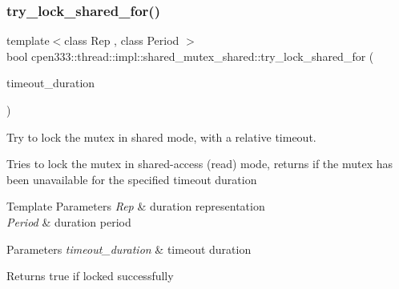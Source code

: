 \subsubsection{\texorpdfstring{try\+\_\+lock\+\_\+shared\+\_\+for()}{try\_lock\_shared\_for()}}
{\footnotesize\ttfamily template$<$class Rep , class Period $>$ \\
bool cpen333\+::thread\+::impl\+::shared\+\_\+mutex\+\_\+shared\+::try\+\_\+lock\+\_\+shared\+\_\+for (\begin{DoxyParamCaption}\item[{const std\+::chrono\+::duration$<$ Rep, Period $>$ \&}]{timeout\+\_\+duration }\end{DoxyParamCaption})\hspace{0.3cm}{\ttfamily [inline]}}



Try to lock the mutex in shared mode, with a relative timeout. 

Tries to lock the mutex in shared-\/access (read) mode, returns if the mutex has been unavailable for the specified timeout duration


\begin{DoxyTemplParams}{Template Parameters}
{\em Rep} & duration representation \\
\hline
{\em Period} & duration period \\
\hline
\end{DoxyTemplParams}

\begin{DoxyParams}{Parameters}
{\em timeout\+\_\+duration} & timeout duration \\
\hline
\end{DoxyParams}
\begin{DoxyReturn}{Returns}
true if locked successfully 
\end{DoxyReturn}
\mbox{\label{classcpen333_1_1thread_1_1impl_1_1shared__mutex__shared_a2e55208ed6d24f5ff3112998ff2f50c5}} 
